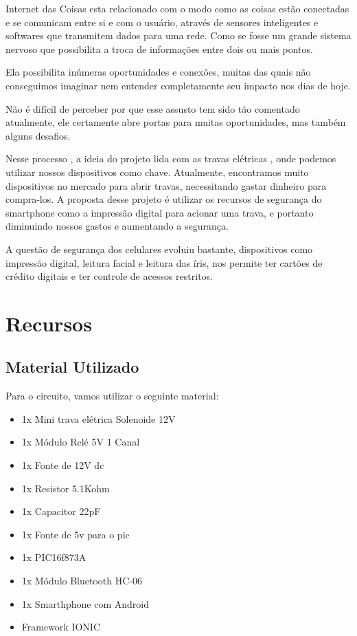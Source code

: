 \documentclass[
	article,			%
	12pt,				%
	oneside,			%
	a4paper,            %
	twocolumn,
	english,			%
	brazil,				%
	sumario=tradicional
	]{abntex2}
\begin{document}
Internet das Coisas esta relacionado com o modo como as coisas estão conectadas e se comunicam entre si e com o usuário, através de sensores inteligentes e softwares que transmitem dados para uma rede. Como se fosse um grande sistema nervoso que possibilita a troca de informações entre dois ou mais pontos.

Ela possibilita inúmeras oportunidades e conexões, muitas das quais não conseguimos imaginar nem entender completamente seu impacto nos dias de hoje.

Não é difícil de perceber por que esse assusto tem sido tão comentado atualmente, ele certamente abre portas para muitas oportunidades, mas também alguns desafios.

Nesse processo , a ideia do projeto lida com as travas elétricas , onde podemos utilizar nossos dispositivos como chave. Atualmente, encontramos muito dispositivos no mercado para abrir travas, necessitando gastar dinheiro para compra-los. A proposta desse projeto é utilizar os recursos de segurança do smartphone como a impressão digital para acionar uma trava, e portanto diminuindo nossos gastos e aumentando a segurança.

A questão de segurança dos celulares evoluiu bastante, dispositivos como impressão digital, leitura facial e leitura das íris, nos permite ter cartões de crédito digitais e ter controle de acessos restritos.


\section{Recursos}

\subsection{Material Utilizado}
Para o circuito, vamos utilizar o seguinte material:

\begin{itemize}
    \item 1x Mini trava elétrica Solenoide 12V
    \item 1x Módulo Relé 5V 1 Canal
    \item 1x Fonte de 12V dc
    \item 1x Resistor 5.1Kohm
    \item 1x Capacitor 22pF
    \item 1x Fonte de 5v para o pic
    \item 1x PIC16f873A
    \item 1x Módulo Bluetooth HC-06
    \item 1x Smarthphone com Android
    \item Framework IONIC
\end{itemize}
\end{document}
